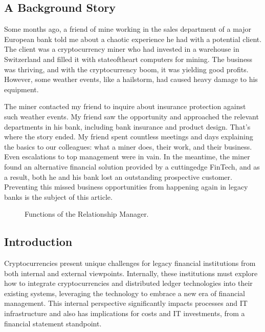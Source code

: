 \documentclass[letterpaper,10pt,english]{jupyterBook}
\let\sphinxpxdimen\pdfpxdimen\else\newdimen\sphinxpxdimen
\begin{document}
\subsection{A Background Story}
\label{\detokenize{LEGACY/legacy:a-background-story}}
\sphinxAtStartPar
Some months ago, a friend of mine working in the sales department of a major European bank told me about a chaotic experience he had with a potential client. The client was a cryptocurrency miner who had invested in a warehouse in Switzerland and filled it with state\sphinxhyphen{}of\sphinxhyphen{}the\sphinxhyphen{}art computers for mining. The business was thriving, and with the cryptocurrency boom, it was yielding good profits. However, some weather events, like a hailstorm, had caused heavy damage to his equipment.

\sphinxAtStartPar
The miner contacted my friend to inquire about insurance protection against such weather events. My friend saw the opportunity and approached the relevant departments in his bank, including bank insurance and product design. That’s where the story ended. My friend spent countless meetings and days explaining the basics to our colleagues: what a miner does, their work, and their business. Even escalations to top management were in vain. In the meantime, the miner found an alternative financial solution provided by a cutting\sphinxhyphen{}edge FinTech, and as a result, both he and his bank lost an outstanding prospective customer. Preventing this missed business opportunities from happening again in legacy banks is the subject of this article.

\begin{figure}[htbp]
\centering
\capstart

\noindent\sphinxincludegraphics[width=750\sphinxpxdimen,height=400\sphinxpxdimen]{{legacy}.png}
\caption{Functions of the Relationship Manager.}\label{\detokenize{LEGACY/legacy:legacy}}\end{figure}


\subsection{Introduction}
\label{\detokenize{LEGACY/legacy:introduction}}
\sphinxAtStartPar
Cryptocurrencies present unique challenges for legacy financial institutions from both internal and external viewpoints. Internally, these institutions must explore how to integrate cryptocurrencies and distributed ledger technologies into their existing systems, leveraging the technology to embrace a new era of financial management. This internal perspective significantly impacts processes and IT infrastructure and also has implications for costs and IT investments, from a financial statement standpoint.
\end{document}

